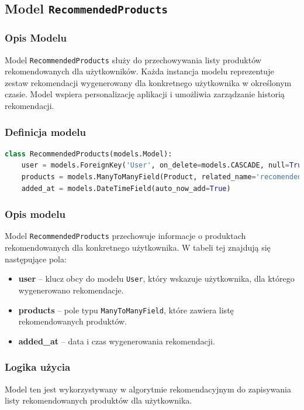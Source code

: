 \documentclass[12pt,a4paper,oneside]{article}
\theoremstyle{definition}
\numberwithin{equation}{section}
\begin{document}
% 
% 
\clearpage
\subsection{Model \texttt{RecommendedProducts}}

\subsubsection{Opis Modelu}
Model \texttt{RecommendedProducts} służy do przechowywania listy produktów rekomendowanych dla użytkowników. 
Każda instancja modelu reprezentuje zestaw rekomendacji wygenerowany dla konkretnego użytkownika w określonym czasie. 
Model wspiera personalizację aplikacji i umożliwia zarządzanie historią rekomendacji.

\subsubsection{Definicja modelu}
\begin{lstlisting}[language=Python, caption={Model \texttt{RecommendedProducts}}]
class RecommendedProducts(models.Model):
    user = models.ForeignKey('User', on_delete=models.CASCADE, null=True, blank=True)
    products = models.ManyToManyField(Product, related_name='recomended_products')
    added_at = models.DateTimeField(auto_now_add=True)
\end{lstlisting}

\subsubsection{Opis modelu}
Model \texttt{RecommendedProducts} przechowuje informacje o produktach rekomendowanych dla konkretnego użytkownika. W tabeli tej znajdują się następujące pola:
\begin{itemize}
    \item \textbf{user} -- klucz obcy do modelu \texttt{User}, który wskazuje użytkownika, dla którego wygenerowano rekomendacje.
    \item \textbf{products} -- pole typu \texttt{ManyToManyField}, które zawiera listę rekomendowanych produktów.
    \item \textbf{added\_at} -- data i czas wygenerowania rekomendacji.
\end{itemize}

\subsubsection{Logika użycia}
Model ten jest wykorzystywany w algorytmie rekomendacyjnym do zapisywania listy rekomendowanych produktów dla użytkownika. 
\end{document}

